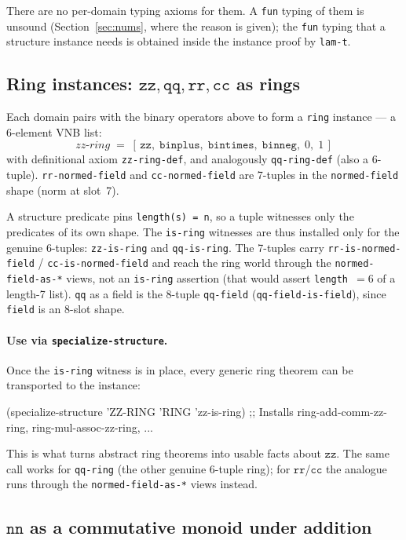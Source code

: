 There are no per-domain typing axioms for them.  A \texttt{fun} typing
of them is unsound (Section~\ref{sec:nums}, where the reason is given);
the \texttt{fun} typing that a structure instance needs is obtained inside
the instance proof by \texttt{lam-t}.

\subsection{Ring instances: $\mathtt{zz}, \mathtt{qq}, \mathtt{rr}, \mathtt{cc}$ as rings}

Each domain pairs with the binary operators above to form a
\texttt{ring} instance --- a 6-element VNB list:
\[
   \mathit{zz\text{-}ring} \;=\;
   [\,\mathtt{zz},\; \mathtt{binplus},\; \mathtt{bintimes},\;
     \mathtt{binneg},\; 0,\; 1\,]
\]
with definitional axiom \texttt{zz-ring-def}, and analogously
\texttt{qq-ring-def} (also a 6-tuple).  \texttt{rr-normed-field} and \texttt{cc-normed-field}
are 7-tuples in the \texttt{normed-field} shape (norm at slot~7).

A structure predicate pins \texttt{length(s) = n}, so a tuple witnesses only
the predicates of its own shape.  The \texttt{is-ring} witnesses are thus
installed only for the genuine 6-tuples: \texttt{zz-is-ring} and
\texttt{qq-is-ring}.  The 7-tuples carry \texttt{rr-is-normed-field} /
\texttt{cc-is-normed-field} and reach the ring world through the
\texttt{normed-field-as-*} views, not an \texttt{is-ring} assertion (that
would assert \texttt{length}~$=6$ of a length-7 list).  \texttt{qq} as a field
is the 8-tuple \texttt{qq-field} (\texttt{qq-field-is-field}), since
\texttt{field} is an 8-slot shape.

\paragraph{Use via \texttt{specialize-structure}.}
Once the \texttt{is-ring} witness is in place, every generic ring theorem can
be transported to the instance:
\begin{VNBcode}
(specialize-structure 'ZZ-RING 'RING 'zz-is-ring)
;; Installs ring-add-comm-zz-ring, ring-mul-assoc-zz-ring, ...
\end{VNBcode}
This is what turns abstract ring theorems into usable facts about
$\mathtt{zz}$.  The same call works for \texttt{qq-ring} (the other genuine
6-tuple ring); for $\mathtt{rr}$/$\mathtt{cc}$ the analogue runs through the
\texttt{normed-field-as-*} views instead.

\subsection{$\mathtt{nn}$ as a commutative monoid under addition}

